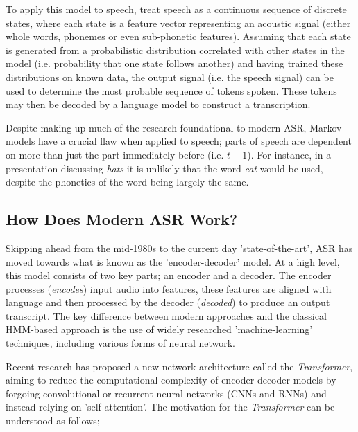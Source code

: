 To apply this model to speech, treat speech as a continuous sequence of discrete states, where each state is a feature vector representing an acoustic signal (either whole words, phonemes or even sub-phonetic features\cite{bengio1999markovian}).
Assuming that each state is generated from a probabilistic distribution correlated with other states in the model\cite{Rabiner1989Feb} (i.e. probability that one state follows another) and having trained these distributions on known data, the output signal (i.e. the speech signal) can be used to determine the most probable sequence of tokens spoken.
These tokens may then be decoded by a language model to construct a transcription\cite{bengio1999markovian}.

Despite making up much of the research foundational to modern ASR, Markov models have a crucial flaw when applied to speech; parts of speech are dependent on more than just the part immediately before (i.e. $t-1$).
For instance, in a presentation discussing \emph{hats} it is unlikely that the word \emph{cat} would be used, despite the phonetics of the word being largely the same.

\subsection{How Does Modern ASR Work?}\label{subsec:modern-asr}

Skipping ahead from the mid-1980s to the current day 'state-of-the-art', ASR has moved towards what is known as the 'encoder-decoder' model.
At a high level, this model consists of two key parts; an encoder and a decoder.
The encoder processes (\emph{encodes}) input audio into features, these features are aligned with language and then processed by the decoder (\emph{decoded}) to produce an output transcript\cite{wang2019overview}.
The key difference between modern approaches and the classical HMM-based approach is the use of widely researched 'machine-learning' techniques, including various forms of neural network\cite{mustafa2019comparative, amodei2016deep, hori2017advances, Kim2017Mar}.

Recent research has proposed a new network architecture called the \emph{Transformer}\cite{vaswani2017attention}, aiming to reduce the computational complexity of encoder-decoder models by forgoing convolutional or recurrent neural networks (CNNs and RNNs) and instead relying on 'self-attention'.
The motivation for the \emph{Transformer} can be understood as follows;

